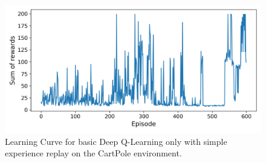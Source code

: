 \begin{figure}[t]
  
  \begin{center}
      \includegraphics[clip, width=0.8\columnwidth]{figures/rl/dqn_cart_pole_plot.png}
  \end{center}
  
  \caption[Learning Curve for Deep Q-Learning on CartPole]{Learning Curve for basic Deep Q-Learning only with simple experience replay on the CartPole environment.}
  \label{fig:learning_curve_dqn}
\end{figure}

